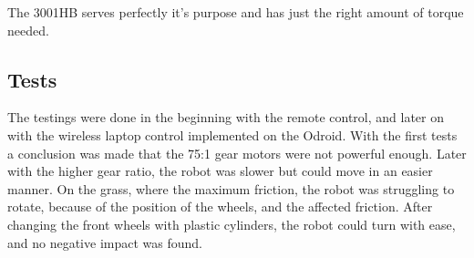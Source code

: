 The 3001HB serves perfectly it's purpose and has just the right amount of torque needed.

\subsection{Tests}

The testings were done in the beginning with the remote control, and later on with the wireless laptop control implemented on the Odroid. With the first tests a conclusion was made that the 75:1 gear motors were not powerful enough. Later with the higher gear ratio, the robot was slower but could move in an easier manner. On the grass, where the maximum friction, the robot was struggling to rotate, because of the position of the wheels, and the affected friction. After changing the front wheels with plastic cylinders, the robot could turn with ease, and no negative impact was found. 